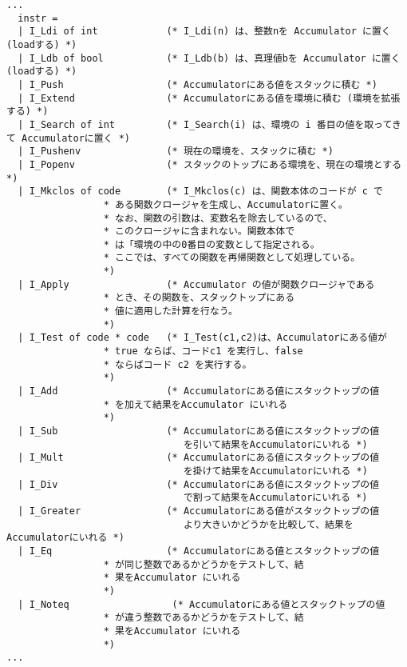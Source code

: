 \documentclass[a4paper,9pt]{jsarticle}
\begin{document}
\begin{lstlisting}[caption=am.ml(抜粋)]
...
  instr =    
  | I_Ldi of int            (* I_Ldi(n) は、整数nを Accumulator に置く (loadする) *)
  | I_Ldb of bool           (* I_Ldb(b) は、真理値bを Accumulator に置く (loadする) *)
  | I_Push                  (* Accumulatorにある値をスタックに積む *)
  | I_Extend                (* Accumulatorにある値を環境に積む (環境を拡張する) *)
  | I_Search of int         (* I_Search(i) は、環境の i 番目の値を取ってきて Accumulatorに置く *)
  | I_Pushenv               (* 現在の環境を、スタックに積む *)
  | I_Popenv                (* スタックのトップにある環境を、現在の環境とする *)
  | I_Mkclos of code        (* I_Mkclos(c) は、関数本体のコードが c で
			     * ある関数クロージャを生成し、Accumulatorに置く。
			     * なお、関数の引数は、変数名を除去しているので、
			     * このクロージャに含まれない。関数本体で
			     * は「環境の中の0番目の変数として指定される。
			     * ここでは、すべての関数を再帰関数として処理している。
			     *)
  | I_Apply                 (* Accumulator の値が関数クロージャである
			     * とき、その関数を、スタックトップにある
			     * 値に適用した計算を行なう。
			     *)
  | I_Test of code * code   (* I_Test(c1,c2)は、Accumulatorにある値が
			     * true ならば、コードc1 を実行し、false
			     * ならばコード c2 を実行する。
			     *)
  | I_Add                   (* Accumulatorにある値にスタックトップの値
			     * を加えて結果をAccumulator にいれる
			     *)
  | I_Sub                   (* Accumulatorにある値にスタックトップの値
                               を引いて結果をAccumulatorにいれる *)
  | I_Mult                  (* Accumulatorにある値にスタックトップの値
                               を掛けて結果をAccumulatorにいれる *)
  | I_Div                   (* Accumulatorにある値にスタックトップの値
                               で割って結果をAccumulatorにいれる *)
  | I_Greater               (* Accumulatorにある値がスタックトップの値
                               より大きいかどうかを比較して、結果をAccumulatorにいれる *)
  | I_Eq                    (* Accumulatorにある値とスタックトップの値
			     * が同じ整数であるかどうかをテストして、結
			     * 果をAccumulator にいれる
			     *)
  | I_Noteq                  (* Accumulatorにある値とスタックトップの値
			     * が違う整数であるかどうかをテストして、結
			     * 果をAccumulator にいれる
			     *)
...


\end{lstlisting}
\end{document}
